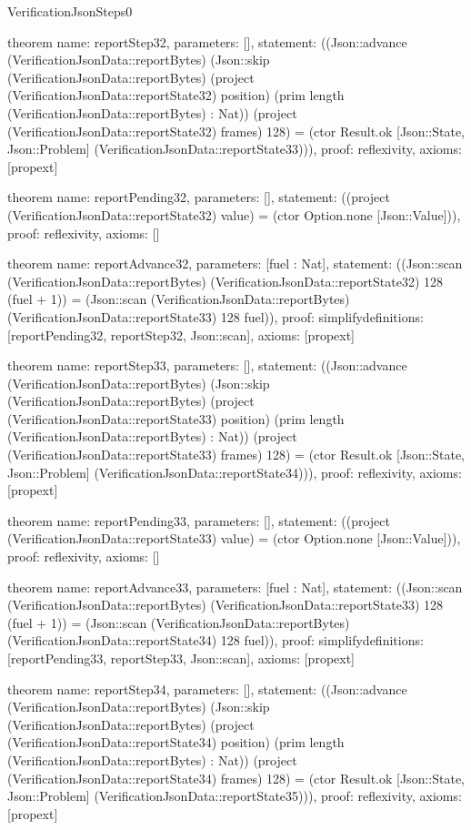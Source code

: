 \begin{lexlean}{VerificationJsonSteps0}
\begin{semanticmodule}
theorem{
  name: reportStep32,
  parameters: [],
  statement: ((Json::advance (VerificationJsonData::reportBytes) (Json::skip (VerificationJsonData::reportBytes) (project (VerificationJsonData::reportState32) position) (prim length (VerificationJsonData::reportBytes) : Nat)) (project (VerificationJsonData::reportState32) frames) 128) = (ctor Result.ok [Json::State, Json::Problem] (VerificationJsonData::reportState33))),
  proof: reflexivity{},
  axioms: [propext]
}

theorem{
  name: reportPending32,
  parameters: [],
  statement: ((project (VerificationJsonData::reportState32) value) = (ctor Option.none [Json::Value])),
  proof: reflexivity{},
  axioms: []
}

theorem{
  name: reportAdvance32,
  parameters: [fuel : Nat],
  statement: ((Json::scan (VerificationJsonData::reportBytes) (VerificationJsonData::reportState32) 128 (fuel + 1)) = (Json::scan (VerificationJsonData::reportBytes) (VerificationJsonData::reportState33) 128 fuel)),
  proof: simplify{definitions: [reportPending32, reportStep32, Json::scan]},
  axioms: [propext]
}

theorem{
  name: reportStep33,
  parameters: [],
  statement: ((Json::advance (VerificationJsonData::reportBytes) (Json::skip (VerificationJsonData::reportBytes) (project (VerificationJsonData::reportState33) position) (prim length (VerificationJsonData::reportBytes) : Nat)) (project (VerificationJsonData::reportState33) frames) 128) = (ctor Result.ok [Json::State, Json::Problem] (VerificationJsonData::reportState34))),
  proof: reflexivity{},
  axioms: [propext]
}

theorem{
  name: reportPending33,
  parameters: [],
  statement: ((project (VerificationJsonData::reportState33) value) = (ctor Option.none [Json::Value])),
  proof: reflexivity{},
  axioms: []
}

theorem{
  name: reportAdvance33,
  parameters: [fuel : Nat],
  statement: ((Json::scan (VerificationJsonData::reportBytes) (VerificationJsonData::reportState33) 128 (fuel + 1)) = (Json::scan (VerificationJsonData::reportBytes) (VerificationJsonData::reportState34) 128 fuel)),
  proof: simplify{definitions: [reportPending33, reportStep33, Json::scan]},
  axioms: [propext]
}

theorem{
  name: reportStep34,
  parameters: [],
  statement: ((Json::advance (VerificationJsonData::reportBytes) (Json::skip (VerificationJsonData::reportBytes) (project (VerificationJsonData::reportState34) position) (prim length (VerificationJsonData::reportBytes) : Nat)) (project (VerificationJsonData::reportState34) frames) 128) = (ctor Result.ok [Json::State, Json::Problem] (VerificationJsonData::reportState35))),
  proof: reflexivity{},
  axioms: [propext]
}


\end{semanticmodule}
\end{lexlean}
